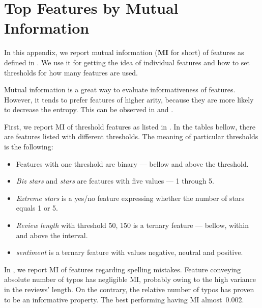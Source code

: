 \chapter{Top Features by Mutual Information}\label{app:mi}

In this appendix, we report mutual information (\textbf{MI} for short) of features as defined in .
We use it for getting the idea of individual features and how to set thresholds for how many features
are used.

Mutual information is a great way to evaluate informativeness of features.
However, it tends to prefer features of higher arity, because
they are more likely to decrease the entropy.
This can be observed in  and .

First, we report MI of threshold features as listed in .
In the tables bellow, there are features listed with different thresholds.
The meaning of particular thresholds is the following:

\begin{itemize}
\item Features with one threshold are binary --- bellow and above the threshold.
\item \textit{Biz stars} and \textit{stars} are features with five values --- 1 through 5.
\item \textit{Extreme stars} is a yes/no feature expressing whether the number of stars equals 1 or 5.
\item \textit{Review length} with threshold 50, 150 is a ternary feature --- bellow, within and above the interval.
\item \textit{sentiment} is a ternary feature with values negative, neutral and positive.
\end{itemize}


In , we report MI of features regarding spelling mistakes.
Feature conveying absolute number of typos has negligible MI, probably owing to the high variance in the reviews' length.
On the contrary, the relative number of typos has proven to be an informative property.
The best performing having MI almost~0.002.

